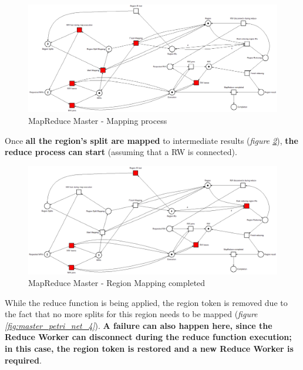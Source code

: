 \begin{figure}[!ht]
    \centering
    \includegraphics[width=\linewidth]{document/chapters/chapter_6/images/master_petri_net_2.png}
    \caption{MapReduce Master - Mapping process}
    \label{fig:master_petri_net_2}
\end{figure}

Once \textbf{all the region's split are mapped} to intermediate results (\textit{figure \ref{fig:master_petri_net_3}}), \textbf{the reduce process can start} (assuming that a RW is connected).

\begin{figure}[!ht]
    \centering
    \includegraphics[width=\linewidth]{document/chapters/chapter_6/images/master_petri_net_3.png}
    \caption{MapReduce Master - Region Mapping completed}
    \label{fig:master_petri_net_3}
\end{figure}

While the reduce function is being applied, the region token is removed due to the fact that no more splits for this region needs to be mapped (\textit{figure \ref{fig:master_petri_net_4}}). \textbf{A failure can also happen here, since the Reduce Worker can disconnect during the reduce function execution; in this case, the region token is restored and a new Reduce Worker is required}.

\vspace{5mm}

